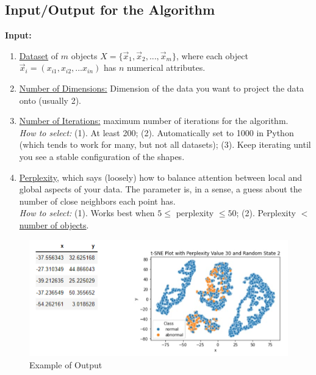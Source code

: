 \documentclass[11pt]{elegantbook}
\begin{document}
\subsection{Input/Output for the Algorithm}
\textbf{Input:}
\begin{enumerate}[$\bullet$]
    \item \underline{Dataset} of $m$ objects $X=\{\vec{x}_1,\vec{x}_2,...,\vec{x}_m\}$, where each object $\vec{x}_i=(x_{i1},x_{i2},...x_{in})$ has $n$ numerical attributes.
    \item \underline{Number of Dimensions:} Dimension of the data you want to project the data onto (usually 2).
    \item \underline{Number of Iterations:} maximum number of iterations for the algorithm.\\
    \textit{How to select:} (1). At least 200; (2). Automatically set to 1000 in Python (which tends to work for many, but not all datasets); (3). Keep iterating until you see a stable configuration of the shapes.
    \item \underline{Perplexity}, which says (loosely) how to balance attention between local and global aspects of your data. The parameter is, in a sense, a guess about the number of close neighbors each point has.\\
    \textit{How to select:} (1). Works best when $5 \leq$ perplexity $\leq 50$; (2). Perplexity $<$ \underline{number of objects}.
\end{enumerate}
\begin{center}\begin{figure}[htbp]
    \centering
    \includegraphics[scale=0.5]{tsne_example_of_output.png}
    \caption{Example of Output}
    \label{}
\end{figure}\end{center}
\end{document}
